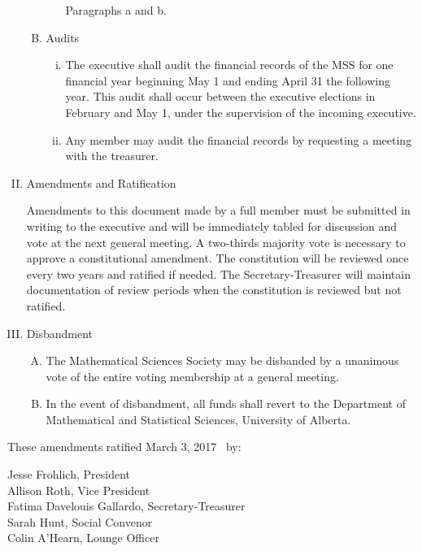 \documentclass[11pt]{article}
\begin{document}
\begin{enumerate}[I.]
\begin{enumerate}[A)]
\begin{enumerate}[i)]
            Paragraphs a and b.
        \end{enumerate}
      \item Audits
        \begin{enumerate}[i)]
          \item The executive shall audit the financial records of the MSS for
            one financial year beginning May 1 and ending April 31 the
            following year. This audit shall occur between the executive
            elections in February and May 1, under the supervision of the
            incoming executive.
          \item Any member may audit the financial records by requesting a
            meeting with the treasurer.
        \end{enumerate}
    \end{enumerate}
  \item Amendments and Ratification

    Amendments to this document made by a full member must be submitted in
    writing to the executive and will be immediately tabled for discussion and
    vote at the next general meeting. A two-thirds majority vote is necessary
    to approve a constitutional amendment. The constitution will be reviewed
    once every two years and ratified if needed. The Secretary-Treasurer will
    maintain documentation of review periods when the constitution is reviewed
    but not ratified.
  \item Disbandment
    \begin{enumerate}[A)]
      \item The Mathematical Sciences Society may be disbanded by a unanimous
        vote of the entire voting membership at a general meeting.
      \item  In the event of disbandment, all funds shall revert to the
        Department of Mathematical and Statistical Sciences, University of
        Alberta.
    \end{enumerate}
\end{enumerate}

These amendments ratified March 3, 2017 \  by:

Jesse Frohlich, President\\
Allison Roth, Vice President\\
Fatima Davelouis Gallardo, Secretary-Treasurer\\
Sarah Hunt, Social Convenor\\
Colin A'Hearn, Lounge Officer
\end{document}
